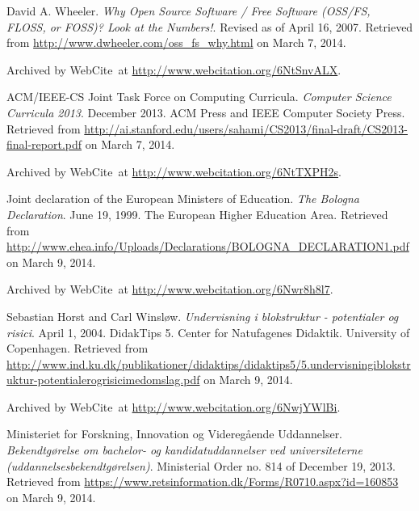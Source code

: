 
\begin{thebibliography}{9} %


David A. Wheeler. \emph{Why Open Source Software / Free Software (OSS/FS,
FLOSS, or FOSS)? Look at the Numbers!}. Revised as of April 16, 2007. Retrieved
from \url{http://www.dwheeler.com/oss_fs_why.html} on March 7, 2014.

Archived by WebCite\textsuperscript{\textregistered}\ at
\url{http://www.webcitation.org/6NtSnvALX}.


ACM/IEEE-CS Joint Task Force on Computing Curricula. \emph{Computer Science
Curricula 2013}. December 2013. ACM Press and IEEE Computer Society Press.
Retrieved from
\url{http://ai.stanford.edu/users/sahami/CS2013/final-draft/CS2013-final-report.pdf}
on March 7, 2014.

Archived by WebCite\textsuperscript{\textregistered}\ at
\url{http://www.webcitation.org/6NtTXPH2s}.


Joint declaration of the European Ministers of Education. \emph{The Bologna
Declaration}. June 19, 1999. The European Higher Education Area. Retrieved from
\url{http://www.ehea.info/Uploads/Declarations/BOLOGNA_DECLARATION1.pdf} on
March 9, 2014.

Archived by WebCite\textsuperscript{\textregistered}\ at
\url{http://www.webcitation.org/6Nwr8h8l7}.


Sebastian Horst and Carl Winsløw. \emph{Undervisning i blokstruktur -
potentialer og risici}. April 1, 2004. DidakTips 5. Center for Natufagenes
Didaktik.  University of Copenhagen. Retrieved from
\url{http://www.ind.ku.dk/publikationer/didaktips/didaktips5/5.undervisningiblokstruktur-potentialerogrisicimedomslag.pdf}
on March 9, 2014.

Archived by WebCite\textsuperscript{\textregistered}\ at
\url{http://www.webcitation.org/6NwjYWlBi}.


Ministeriet for Forskning, Innovation og Videregående Uddannelser.
\emph{Bekendtgørelse om bachelor- og kandidatuddannelser ved universiteterne
(uddannelsesbekendtgørelsen)}. Ministerial Order no. 814 of December 19,
2013.  Retrieved from
\url{https://www.retsinformation.dk/Forms/R0710.aspx?id=160853} on March 9,
2014.


\end{thebibliography}
